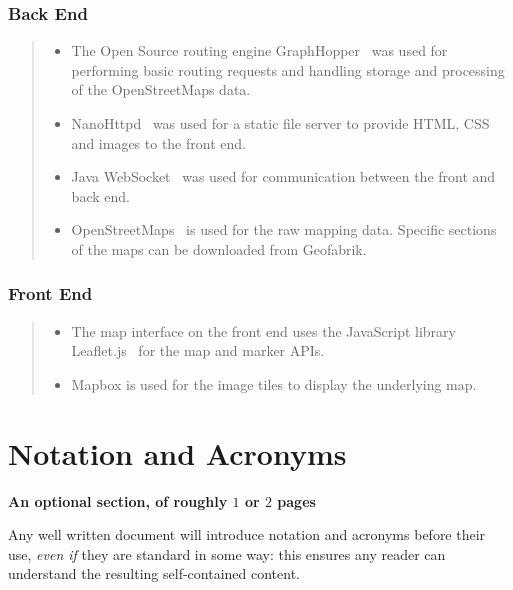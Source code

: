 \documentclass[ %
                    author={Alexander Hill},
                supervisor={Dr. Benjamin Sach},
                    degree={MEng},
                     title={MARMOSET: Multi Agent Routing for Managing Online Smart-cities for Efficient Transportation},
                  subtitle={},
                      type={research},
                      year={2016} ]{dissertation}
\begin{document}
\subsection*{Back End}
\begin{quote}
\noindent
\begin{itemize}
    \item The Open Source routing engine GraphHopper~\cite{graphhopper} was
        used for performing basic routing requests and handling storage and
        processing of the OpenStreetMaps data.
    \item NanoHttpd~\cite{nanohttpd} was used for a static file server to
        provide HTML, CSS and images to the front end.
    \item Java WebSocket~\cite{javawebsocket} was used for communication
        between the front and back end.
    \item OpenStreetMaps~\cite{osm} is used for the raw mapping data. Specific sections of
        the maps can be downloaded from Geofabrik.
\end{itemize}
\end{quote}

\subsection*{Front End}
\begin{quote}
\noindent
\begin{itemize}
    \item The map interface on the front end uses the JavaScript library
        Leaflet.js~\cite{leaflet} for the map and marker APIs.
    \item Mapbox is used for the image tiles to display the underlying map.
\end{itemize}
\end{quote}



\chapter*{Notation and Acronyms}

{\bf An optional section, of roughly $1$ or $2$ pages}
\vspace{1cm}

\noindent
Any well written document will introduce notation and acronyms before
their use, {\em even if} they are standard in some way: this ensures
any reader can understand the resulting self-contained content.
\end{document}
